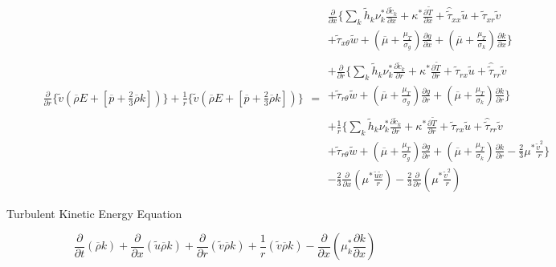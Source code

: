 \begin{description}
\begin{displaymath}
\begin{array}{c}
		\frac{\partial}{\partial r}\Big\{\tilde v(\overline{\rho}E + [\overline{p} + \frac{2}{3}\overline{\rho}k])\Big\} +
		\frac{1}{r}\Big\{\tilde v(\overline{\rho}E + [\overline{p} + \frac{2}{3}\overline{\rho}k])\Big\}
	\end{array} = 
	\begin{array}{c}
		\frac{\partial}{\partial x}\Big\{
		\sum_{k}\tilde h_k \nu_k^* \frac{\partial \tilde c_k}{\partial x} + \kappa^*\frac{\partial \tilde T}
		{\partial x} + \hat{\tilde \tau}_{xx} \tilde u + \tilde \tau_{xr} \tilde v  
	 	\\
		+ \tilde \tau_{x\theta} \tilde w + (\overline{\mu} + \frac{\mu_T}{\sigma_g})\frac{\partial g}{\partial x} 
		+ (\overline{\mu} + \frac{\mu_T}{\sigma_k})\frac{\partial k}{\partial x} \Big\}
		\\ \\ + 
		\frac{\partial}{\partial r}\Big\{
		\sum_{k}\tilde h_k \nu_k^* \frac{\partial \tilde c_k}{\partial r} + \kappa^*\frac{\partial \tilde T}
		{\partial r} + \tilde \tau_{rx} \tilde u + \hat{\tilde \tau}_{rr} \tilde v  
	 	\\
		+ \tilde \tau_{r\theta} \tilde w + (\overline{\mu} + \frac{\mu_T}{\sigma_g})\frac{\partial g}{\partial r}
		+ (\overline{\mu} + \frac{\mu_T}{\sigma_k})\frac{\partial k}{\partial r} \Big\} 
		\\ \\+ 
		\frac{1}{r}\Big\{
		\sum_{k}\tilde h_k \nu_k^* \frac{\partial \tilde c_k}{\partial r} + \kappa^*\frac{\partial \tilde T}
		{\partial r} + \tilde \tau_{rx} \tilde u + \hat{\tilde \tau}_{rr} \tilde v  
	 	\\
		+ \tilde \tau_{r\theta} \tilde w+ (\overline{\mu} + \frac{\mu_T}{\sigma_g})\frac{\partial g}{\partial r}
		+ (\overline{\mu} + \frac{\mu_T}{\sigma_k})\frac{\partial k}{\partial r}-\frac{2}{3}\mu^*\frac{\tilde v^2}{r} 
		\Big\}
		\\
		-\frac{2}{3}\frac{\partial}{\partial x}(\mu^*\frac{\tilde u \tilde v}{r}) 
		-\frac{2}{3}\frac{\partial}{\partial r}(\mu^*\frac{\tilde v^2}{r})  
	\end{array}
	\end{displaymath}
	\item[Turbulent Kinetic Energy Equation]
	\begin{displaymath}
	\frac{\partial}{\partial t}(\overline{\rho} k)
	+ \frac{\partial}{\partial x}(\tilde u \overline{\rho} k) + \frac{\partial}{\partial r}(\tilde v \overline{\rho} k)
	+ \frac{1}{r}(\tilde v \overline{\rho} k)
	- \frac{\partial}{\partial x}(\mu^*_k\frac{\partial k}{\partial x})

\end{displaymath}
\end{description}
